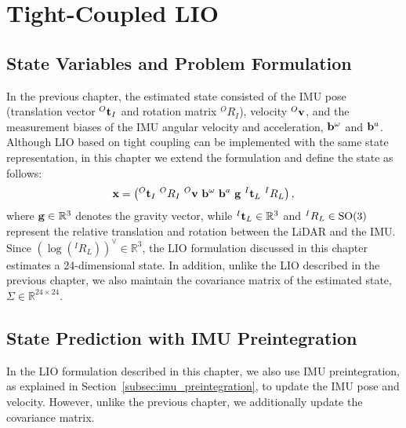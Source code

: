 \chapter{Tight-Coupled LIO}

\section{State Variables and Problem Formulation}

In the previous chapter, the estimated state consisted of the IMU pose (translation vector ${}^{O}{\bf t}_{I}$ and rotation matrix ${}^{O}R_{I}$), velocity ${}^{O}{\bf v}$, and the measurement biases of the IMU angular velocity and acceleration, ${\bf b}^{\omega}$ and ${\bf b}^{a}$.
Although LIO based on tight coupling can be implemented with the same state representation, in this chapter we extend the formulation and define the state as follows:
%
\begin{align}
  {\bf x} = \left( {}^{O}{\bf t}_{I} ~ {}^{O}R_{I} ~ {}^{O}{\bf v} ~ {\bf b}^{\omega} ~ {\bf b}^{a} ~ {\bf g} ~ {}^{I}{\bf t}_{L} ~ {}^{I}R_{L} \right),
  \label{eq:tight_coupling_lio_state}
\end{align}
%
where ${\bf g} \in \mathbb{R}^{3}$ denotes the gravity vector, while ${}^{I}{\bf t}_{L} \in \mathbb{R}^{3}$ and ${}^{I}R_{L} \in {\rm SO}(3)$ represent the relative translation and rotation between the LiDAR and the IMU.
Since $\left( \log \left( {}^{I}R_{L} \right) \right)^{\vee} \in \mathbb{R}^{3}$, the LIO formulation discussed in this chapter estimates a 24-dimensional state.
In addition, unlike the LIO described in the previous chapter, we also maintain the covariance matrix of the estimated state, $\Sigma \in \mathbb{R}^{24 \times 24}$.













\section{State Prediction with IMU Preintegration}

In the LIO formulation described in this chapter, we also use IMU preintegration, as explained in Section~\ref{subsec:imu_preintegration}, to update the IMU pose and velocity.
However, unlike the previous chapter, we additionally update the covariance matrix.

